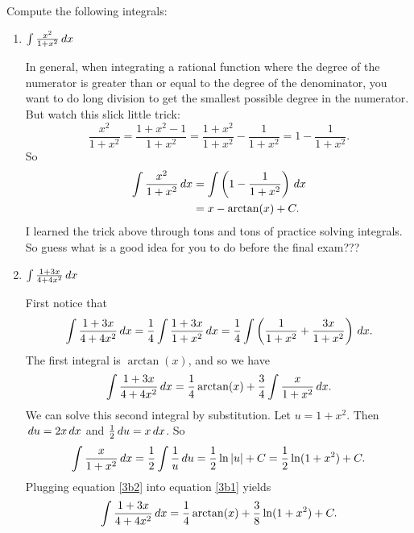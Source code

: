 \documentclass[handout,nooutcomes]{ximera}
\begin{document}
\begin{problem}
Compute the following integrals:

	\begin{enumerate}
	
	\item  $\int \frac{x^2 }{1 + x^2} \,d x$
		\begin{freeResponse}
		In general, when integrating a rational function where the degree of the numerator is greater than or equal to the degree
		of the denominator, you want to do long division to get the smallest possible degree in the numerator.  
		But watch this slick little trick:
			\begin{equation*}
			\frac{x^2}{1+x^2} = \frac{1 + x^2 - 1}{1+x^2} = \frac{1+x^2}{1+x^2} - \frac{1}{1+x^2} = 1 - \frac{1}{1+x^2}.
			\end{equation*}
		So
			\begin{align*}
			\int \frac{x^2 }{1 + x^2} \,d x &= \int \left( 1 - \frac{1}{1+x^2} \right) \,d x  \\
			&= x - \arctan(x) + C.
			\end{align*}
		I learned the trick above through tons and tons of practice solving integrals.  
		So guess what is a good idea for you to do before the final exam???
		\end{freeResponse}
		
		
		
	\item  $ \int \frac{1+3x}{4+4x^2} \,d x$
		\begin{freeResponse}
		First notice that
			\begin{equation*}
			\int \frac{1+3x}{4+4x^2} \,d x = \frac{1}{4} \int \frac{1+3x}{1+x^2} \,d x = \frac{1}{4} \int \left( \frac{1}{1+x^2} + \frac{3x}{1+x^2} \right) \,d x.
			\end{equation*}
		The first integral is $\arctan(x)$, and so we have
			\begin{equation}\label{3b1}
			\int \frac{1+3x}{4+4x^2} \,d x = \frac{1}{4} \arctan(x) + \frac{3}{4} \int \frac{x}{1+x^2} \,d x.
			\end{equation}
		We can solve this second integral by substitution.  Let $u=1+x^2$.  Then $\,d u = 2x \,d x$ and $\frac{1}{2} \,d u = x \,d x$.  So
			\begin{equation}\label{3b2}
			\int \frac{x}{1+x^2} \,d x = \frac{1}{2} \int \frac{1}{u} \,d u = \frac{1}{2} \ln|u| +C = \frac{1}{2} \ln(1+x^2) + C.
			\end{equation}
		Plugging equation \eqref{3b2} into equation \eqref{3b1} yields
			\begin{equation*}
			\int \frac{1+3x}{4+4x^2} \,d x = \frac{1}{4} \arctan(x) + \frac{3}{8} \ln(1+x^2) + C.
			\end{equation*}
		\end{freeResponse}
		
		
		
	\end{enumerate}
			
			
		
\end{problem}
\end{document}
